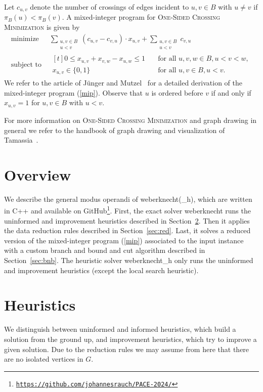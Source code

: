 \documentclass[a4paper,UKenglish,cleveref, autoref, thm-restate]{lipics-v2021}
\newcommand{\OSCM}{\textsc{One-Sided Crossing Minimization}}
\begin{document}
Let $c_{u,v}$ denote the number of crossings of edges incident to $u, v \in B$ with $u \neq v$ if $\pi_B(u) < \pi_B(v)$.
A mixed-integer program for \OSCM{} is given by
\begin{equation}
\label{mip}
\begin{alignedat}{2}
\text{minimize } &\sum_{\substack{u, v \in B\\u < v}} (c_{u,v} - c_{v,u}) \cdot x_{u,v} + \sum_{\substack{u, v \in B\\u < v}} c_{v,u}\\
\text{subject to } &\begin{aligned}[t]
0 \leq x_{u,v} + x_{v,w} - x_{u,w} \leq 1 &\quad\text{for all }u,v,w \in B, u < v < w,\\
x_{u,v} \in \{0,1\} &\quad\text{for all }u,v \in B, u < v.
\end{aligned}
\end{alignedat}\tag{$P_I$}
\end{equation}
We refer to the article of Jünger and Mutzel~\cite{juenger1997twolayer} for a detailed derivation of the mixed-integer program (\ref{mip}).
Observe that $u$ is ordered before $v$ if and only if $x_{u,v} = 1$ for $u, v \in B$ with $u < v$.

For more information on \OSCM{} and graph drawing in general we refer to the handbook of graph drawing and visualization of Tamassia~\cite{tamassia2013handbook}.

\section{Overview}
We describe the general modus operandi of \textsf{weberknecht(\_h)}, which are written in C++ and available on GitHub\footnote{\href{https://github.com/johannesrauch/PACE-2024/}{\texttt{https://github.com/johannesrauch/PACE-2024/}}}.
First, the exact solver \textsf{weberknecht} runs the uninformed and improvement heuristics described in Section~\ref{sec:heu}.
Then it applies the data reduction rules described in Section~\ref{sec:red}.
Last, it solves a reduced version of the mixed-integer program (\ref{mip}) associated to the input instance with a custom branch and bound and cut algorithm described in Section~\ref{sec:bnb}.
The heuristic solver \textsf{weberknecht\_h} only runs the uninformed and improvement heuristics (except the local search heuristic).


\section{Heuristics}\label{sec:heu}
We distinguish between uninformed and informed heuristics, which build a solution from the ground up, and improvement heuristics, which try to improve a given solution.
Due to the reduction rules we may assume from here that there are no isolated vertices in $G$.
\end{document}
